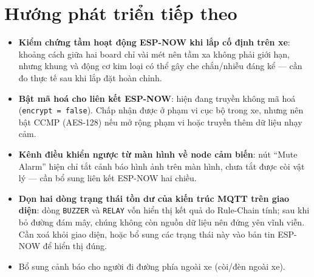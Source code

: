 \documentclass[a4paper,12pt]{article}
\newcommand{\code}[1]{\texttt{#1}}
\begin{document}
\section{Hướng phát triển tiếp theo}
\label{sec:future}

\begin{itemize}[nosep]
    \item \textbf{Kiểm chứng tầm hoạt động ESP-NOW khi lắp cố định trên xe}: khoảng cách giữa hai board chỉ vài mét nên tầm xa không phải giới hạn, nhưng khung và động cơ kim loại có thể gây che chắn/nhiễu đáng kể — cần đo thực tế sau khi lắp đặt hoàn chỉnh.
    \item \textbf{Bật mã hoá cho liên kết ESP-NOW}: hiện đang truyền không mã hoá (\code{encrypt = false}). Chấp nhận được ở phạm vi cục bộ trong xe, nhưng nên bật CCMP (AES-128) nếu mở rộng phạm vi hoặc truyền thêm dữ liệu nhạy cảm.
    \item \textbf{Kênh điều khiển ngược từ màn hình về node cảm biến}: nút ``Mute Alarm'' hiện chỉ tắt cảnh báo hình ảnh trên màn hình, chưa tắt được còi vật lý — cần bổ sung liên kết ESP-NOW hai chiều.
    \item \textbf{Dọn hai dòng trạng thái tồn dư của kiến trúc MQTT trên giao diện}: dòng \code{BUZZER} và \code{RELAY} vốn hiển thị kết quả do Rule-Chain tính; sau khi bỏ đường đám mây, chúng không còn nguồn dữ liệu nên đứng yên vĩnh viễn. Cần xoá khỏi giao diện, hoặc bổ sung các trạng thái này vào bản tin ESP-NOW để hiển thị đúng.
    \item Bổ sung cảnh báo cho người đi đường phía ngoài xe (còi/đèn ngoài xe).
\end{itemize}
\end{document}

